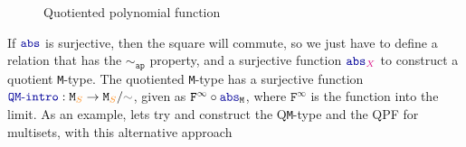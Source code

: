 \documentclass[twoside,11pt,openright]{report}
\theoremstyle{plain} %
\theoremstyle{definition}
\theoremstyle{remark}
\newcommand*{\type}[1]{\textcolor{magenta!90!black}{#1}}
\newcommand*{\container}[1]{\textcolor{orange}{#1}}
\newcommand*{\relation}[1]{\textcolor{gray!75!black}{\ensuremath{\mathtt{#1}}}}
\newcommand*{\function}[1]{\textcolor{blue!60!black}{\ensuremath{\mathtt{#1}}}}
\newcommand*{\typeformer}[1]{\ensuremath{\mathtt{#1}}}
\newcommand*{\functor}[1]{\ensuremath{\mathbf{\mathtt{#1}}}}
\begin{document}
\begin{figure}[h]
  \centering
  \caption{Quotiented polynomial function}
  \label{fig:QPF-diagram}
\end{figure}
If \(\function{abs}\) is surjective, then the square will commute, so we just have to define a relation that has the \function{\sim_{ap}} property, and a surjective function \(\function{abs}_{\type{X}}\) to construct a quotient \texttt{M}-type. The quotiented \texttt{M}-type has a surjective function \(\function{QM\text{-}intro} : \typeformer{M}_{\container{S}} \rightarrow \typeformer{M}_{\container{S}} / \relation{\sim}\), given as \(\functor{F}^{\infty} \circ \function{abs}_{\typeformer{M}}\), where \(\functor{F}^\infty\) is the function into the limit. As an example, lets try and construct the Q\texttt{M}-type and the QPF for multisets, with this alternative approach
\end{document}

